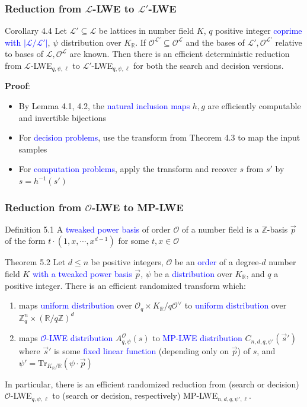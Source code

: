 \documentclass{beamer}
\newcommand{\blue}[1]{\textcolor{blue}{#1}}
\newcommand{\dgreen}[1]{\textcolor{dgreen}{#1}}
\newcommand{\cL}{\mathcal{L}}
\newcommand{\cO}{\mathcal{O}}
\newcommand{\bbR}{\mathbb{R}}
\newcommand{\bbZ}{\mathbb{Z}}
\newcommand{\TrKRR}{\mathrm{Tr}_{K_{\mathbb{R}}/\mathbb{R}}}
\newcommand{\cOL}{\mathcal{O}^{\mathcal{L}}}
\newcommand{\cOV}{\mathcal{O}^{\vee}}
\newcommand{\cOLp}{\mathcal{O}^{\mathcal{L'}}}
\newcommand{\KR}{K_{\mathbb{R}}}
\newcommand{\vp}{\vec{p}}
\newcommand{\vs}{\vec{s}}
\begin{document}
\frame
{
  \frametitle{Reduction from $\cL$-LWE to $\cL'$-LWE}
  \begin{block}{Corollary 4.4}
  Let $\cL'\subseteq\cL$ be lattices in number field $K$, $q$ positive integer \blue{coprime with $|\cL/\cL'|$}, $\psi$ distribution over $\KR$.
  If $\cOLp\subseteq\cOL$ and the bases of $\cL',\cOLp$ relative to bases of $\cL,\cOL$ are known. Then there is an \dgreen{efficient deterministic reduction} from $\cL$-LWE$_{q,\psi,\ell}$ to $\cL'$-LWE$_{q,\psi,\ell}$ for both the search and decision versions.
  \end{block}
  \textbf{Proof}:
  \begin{itemize}
  	\item By Lemma 4.1, 4.2, the \blue{natural inclusion maps} $h,g$ are efficiently \dgreen{computable and invertible bijections}
  	\item For \blue{decision problems}, use the \dgreen{transform} from Theorem 4.3 to map the input samples
  	\item For \blue{computation problems}, apply the transform and recover $s$ from $s'$ by $s=h^{-1}(s')$
  \end{itemize}
}

\frame
{
  \frametitle{Reduction from $\cO$-LWE to MP-LWE}
  \begin{block}{Definition 5.1}
  A \blue{tweaked power basis} of order $\cO$ of a number field is a $\bbZ$-basis $\vp$ of the form $t\cdot(1,x,\cdots,x^{d-1})$ for some $t,x\in\cO$
  \end{block}

  \begin{block}{Theorem 5.2}
	Let $d\leq n$ be positive integers, $\cO$ be an \blue{order} of a degree-$d$ number field $K$ \blue{with a tweaked power basis} $\vp$, $\psi$ be a \blue{distribution} over $\KR$, and $q$ a positive integer. There is an \dgreen{efficient randomized transform} which:
	\begin{enumerate}
		\item maps \blue{uniform distribution} over $\cO_q\times\KR/q\cOV$ to \blue{uniform distribution} over $\bbZ_q^n\times(\bbR/q\bbZ)^d$
		\item maps \blue{$\cO$-LWE distribution} $A_{q,\psi}^{\cO}(s)$ to \blue{MP-LWE distribution} $C_{n,d,q,\psi'}(\vs')$ where $\vs'$ is some \blue{fixed linear function} (depending only on $\vp$) of $s$, and $\psi'=\TrKRR(\psi\cdot\vp)$
	\end{enumerate}
	In particular, there is an \dgreen{efficient randomized reduction} from (search or decision) $\cO$-LWE$_{q,\psi,\ell}$ to (search or decision, respectively) MP-LWE$_{n,d,q,\psi',\ell}$.
  \end{block}
}
\end{document}
